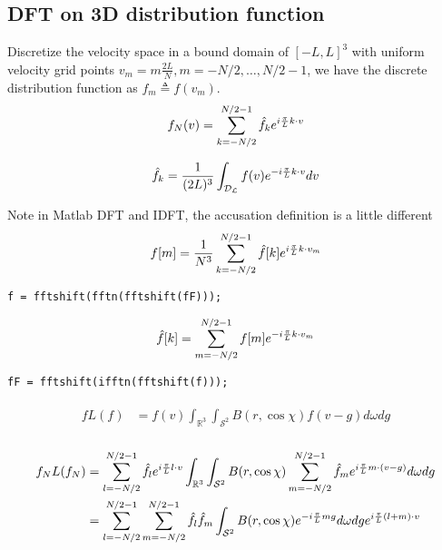 \documentclass[11pt]{amsart}
\begin{document}
 \subsection{DFT on 3D distribution function}
Discretize the velocity space in a bound domain of $[-L,L]^3$ with uniform velocity grid points  $v_m = m \frac{2L}{N}, m =  -N/2, \ldots, N/2-1$, we have the discrete distribution function as $f_m \triangleq f(v_m)$. 
\begin{equation}
 f_N(v) = \sum_{k = -N/2}^{N/2-1}\hat f_k e^{i{\pi \over L}k\cdot v}
\end{equation}

\begin{equation}
\hat f_k = \frac{1}{(2L)^3}\int_\mathcal{D_L} f(v) e^{-i {\pi \over L} k \cdot v}dv 
\end{equation}

\color{blue}
Note in Matlab DFT and IDFT, the accusation definition is a little different
\begin{equation}
 f[m] = \frac{1}{N^3}\sum_{k = -N/2}^{N/2-1}\hat f[k] e^{i{\pi \over L}k\cdot v_m}
\end{equation}
\begin{lstlisting}
f = fftshift(fftn(fftshift(fF)));
\end{lstlisting}
\begin{equation}
\hat f[k] = \sum_{m = -N/2}^{N/2-1}  f[m] e^{-i {\pi \over L} k \cdot v_m} 
\end{equation}
\begin{lstlisting}
fF = fftshift(ifftn(fftshift(f)));
\end{lstlisting}

\color{black}
\begin{align*}
\begin{split}
fL(f) &= f(v)\int_{\mathbb{R}^3} \int_{\mathcal{S}^2} {B}(r,\cos\chi)f(v-g)d\omega dg \\
\end{split}
\end{align*}

\begin{align*}
\begin{split}
f_NL(f_N) &=  \sum_{l = -N/2}^{N/2-1}\hat f_l e^{i{\pi \over L}l\cdot v} \int_{\mathbb{R}^3} \int_{\mathcal{S}^2} {B}(r,\cos\chi)   \sum_{m = -N/2}^{N/2-1}\hat f_m e^{i{\pi \over L}m\cdot (v-g)} d\omega dg \\
&=  \sum_{l = -N/2}^{N/2-1}\sum_{m = -N/2}^{N/2-1}\hat f_l \hat f_m  \int_{\mathcal{S}^2} {B}(r,\cos\chi)  e^{-i{\pi \over L}mg} d\omega dg e^{i{\pi \over L}(l+m)\cdot v}
\end{split}
\end{align*}
\end{document}
